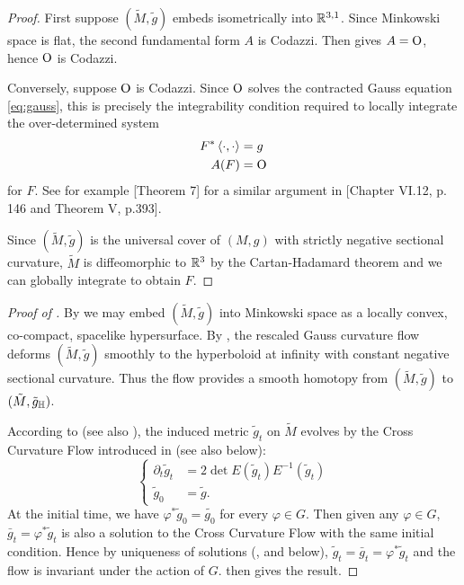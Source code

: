 \documentclass[a4paper,12pt]{amsart}
\begin{document}
\begin{proof}
First suppose \((\tilde{M}, \tilde{g})\) embeds isometrically into \(\mathbb{R}^{3,1}\). Since Minkowski space is flat, the second fundamental form \(A\) is Codazzi. Then  gives \(A = \operatorname{O}\), hence \(\operatorname{O}\) is Codazzi.

Conversely, suppose \(\operatorname{O}\) is Codazzi. Since $\operatorname{O}$ solves the contracted Gauss equation \eqref{eq:gauss}, this is precisely the integrability condition required to locally integrate the over-determined system
\begin{align*}
F^{\ast} \left\langle \cdot,\cdot \right\rangle &= g \\
A(F) &= \operatorname{O}
\end{align*}
for \(F\). See for example \cite{MR1713298}[Theorem 7] for a similar argument in \cite{MR1013365}[Chapter VI.12, p. 146 and Theorem V, p.393].

Since \((\tilde{M}, \tilde{g})\) is the universal cover of \((M, g)\) with strictly negative sectional curvature, \(\tilde{M}\) is diffeomorphic to \(\mathbb{R}^3\) by the Cartan-Hadamard theorem and we can globally integrate to obtain \(F\).
\end{proof}

\begin{proof}
[Proof of ]

By  we may embed \((\tilde{M}, \tilde{g})\) into Minkowski space as a locally convex, co-compact, spacelike hypersurface. By \cite[Theorem 1.1]{MR3344442}, the rescaled Gauss curvature flow deforms \((\tilde{M}, \tilde{g})\) smoothly to the hyperboloid at infinity with constant negative sectional curvature. Thus the flow provides a smooth homotopy from \((\tilde{M}, \tilde{g})\) to \((\tilde{M}, \tilde{g}_{\mathbb{H}})\).

According to \cite[11. Application to the cross-curvature flow]{MR3344442} (see also ), the induced metric \(\tilde{g}_t\) on \(\tilde{M}\) evolves by the Cross Curvature Flow introduced in \cite{MR2055396} (see also  below):
\[
\begin{cases}
\partial_t \tilde{g}_t &= 2\det E(\tilde{g}_{t}) E^{-1}(\tilde{g}_{t}) \\
\tilde{g}_0 &= \tilde{g}.
\end{cases}
\]
At the initial time, we have \(\varphi^{\ast} \tilde{g}_0 = \tilde{g_0}\) for every \(\varphi \in G\). Then given any \(\varphi \in G\), \(\bar{g}_t = \varphi^{\ast} \tilde{g}_t\) is also a solution to the Cross Curvature Flow with the same initial condition. Hence by uniqueness of solutions (\cite{MR2055396,MR2207496},  and  below), \(\tilde{g}_t = \bar{g}_t = \varphi^{\ast} \tilde{g}_t\) and the flow is invariant under the action of \(G\).  then gives the result.
\end{proof}
\end{document}
